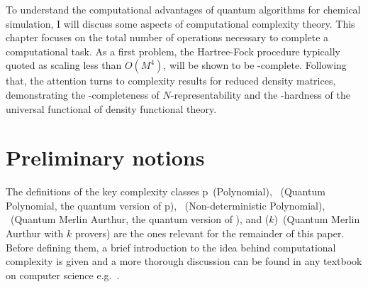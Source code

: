 \documentclass[11pt,oneside,final]{huthesis}%
\begin{document}
To understand the computational advantages of quantum algorithms for chemical
simulation, I will discuss some aspects of computational complexity theory. 
 This chapter 
 focuses on the total number of operations necessary 
to complete a computational task.
As a first problem, the Hartree-Fock procedure typically quoted as scaling less than $O(M^4)$, will be shown to be \np-complete.  Following that, the  attention turns to complexity results for reduced density matrices, demonstrating the \qma-completeness of $N$-representability and the \qma-hardness of the universal functional of density functional theory. 







\section{Preliminary notions}

The definitions of the key complexity classes {\sc p}~(Polynomial), \bqp~(Quantum Polynomial, the quantum version of {\sc p}), \np~(Non-deterministic Polynomial), \qma~(Quantum Merlin Aurthur, the quantum version of \np), and  \qma($k$)~(Quantum Merlin Aurthur with $k$ provers) are the ones relevant for the remainder of this paper. Before defining them, a brief introduction to the idea behind computational complexity is given and a more thorough discussion can be found in any textbook on computer science e.g.~\cite{Sipser97,Arora09}.
\end{document}
